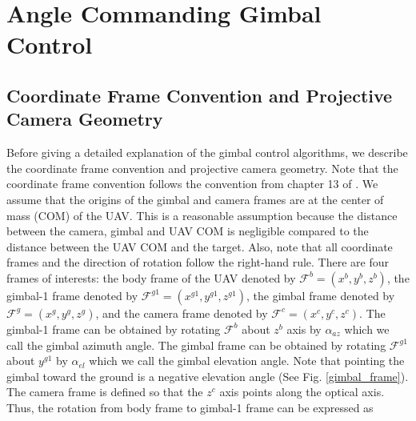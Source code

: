 \section{Angle Commanding Gimbal Control}
\subsection{Coordinate Frame Convention and Projective Camera Geometry}
Before giving a detailed explanation of the gimbal control algorithms, we describe the coordinate frame convention and projective camera geometry. Note that the coordinate frame convention follows the convention from chapter 13 of \cite{beard2012 small}. We assume that the origins of the gimbal and camera frames are at the center of mass (COM) of the UAV. This is a reasonable assumption because the distance between the camera, gimbal and UAV COM is negligible compared to the distance between the UAV COM and the target. Also, note that all coordinate frames and the direction of rotation follow the right-hand rule. There are four frames of interests: the body frame of the UAV denoted by $\mathcal{F}^b=(x^{b}, y^{b}, z^{b})$, the gimbal-1 frame denoted by $\mathcal{F}^{g1}=(x^{g1}, y^{g1}, z^{g1})$, the gimbal frame denoted by $\mathcal{F}^{g}=(x^{g}, y^{g}, z^{g})$, and the camera frame denoted by $\mathcal{F}^{c}=(x^{c}, y^{c}, z^{c})$. The gimbal-1 frame can be obtained by rotating $\mathcal{F}^b$ about $z^{b}$ axis by $\alpha_{az}$ which we call the gimbal azimuth angle. The gimbal frame can be obtained by rotating $\mathcal{F}^{g1}$ about $y^{g1}$ by $\alpha_{el}$ which we call the gimbal elevation angle. Note that pointing the gimbal toward the ground is a negative elevation angle (See Fig. \ref{gimbal_frame}). The camera frame is defined so that the $z^{c}$ axis points along the optical axis. Thus, the rotation from body frame to gimbal-1 frame can be expressed as


